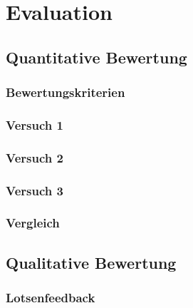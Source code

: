 \chapter{Evaluation}
\label{ch:evaluation}


\section{Quantitative Bewertung}
\subsection{Bewertungskriterien}
\subsection{Versuch 1}
\subsection{Versuch 2}
\subsection{Versuch 3}
\subsection{Vergleich}

\section{Qualitative Bewertung}
\subsection{Lotsenfeedback}

